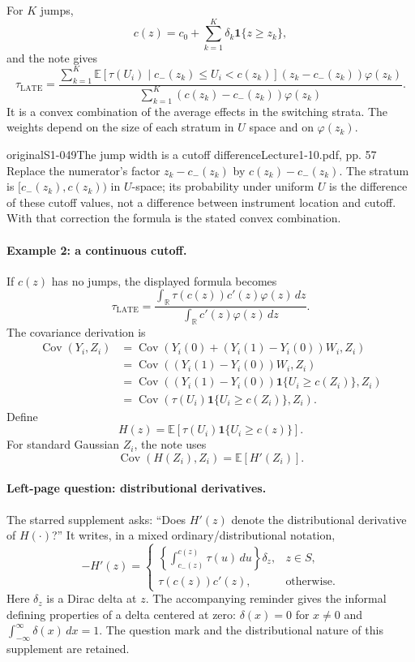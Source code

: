 For $K$ jumps,
\[
 c(z)=c_0+\sum_{k=1}^K\delta_k\mathbf1\{z\ge z_k\},
\]
and the note gives
\[
 \tau_{\mathrm{LATE}}=
 \frac{\displaystyle\sum_{k=1}^K
 \mathbb E[\tau(U_i)\mid c_-(z_k)\le U_i<c(z_k)]
 (z_k-c_-(z_k))\varphi(z_k)}
 {\displaystyle\sum_{k=1}^K(c(z_k)-c_-(z_k))\varphi(z_k)}.
\]
It is a convex combination of the average effects in the switching strata. The weights depend on the size of each stratum in $U$ space and on $\varphi(z_k)$.
\begin{reviewnote}{original}{S1-049}{The jump width is a cutoff difference}{Lecture1-10.pdf, pp. 57}
Replace the numerator's factor $z_k-c_-(z_k)$ by $c(z_k)-c_-(z_k)$. The stratum is $[c_-(z_k),c(z_k))$ in $U$-space; its probability under uniform $U$ is the difference of these cutoff values, not a difference between instrument location and cutoff. With that correction the formula is the stated convex combination.
\end{reviewnote}



\paragraph{Example 2: a continuous cutoff.}
If $c(z)$ has no jumps, the displayed formula becomes
\[
 \tau_{\mathrm{LATE}}=
 \frac{\displaystyle\int_{\mathbb R}\tau(c(z))c'(z)\varphi(z)\,dz}
 {\displaystyle\int_{\mathbb R}c'(z)\varphi(z)\,dz}.
\]
The covariance derivation is
\begin{align*}
 \operatorname{Cov}(Y_i,Z_i)
 &=\operatorname{Cov}(Y_i(0)+(Y_i(1)-Y_i(0))W_i,Z_i)\\
 &=\operatorname{Cov}((Y_i(1)-Y_i(0))W_i,Z_i)\\
 &=\operatorname{Cov}((Y_i(1)-Y_i(0))\mathbf1\{U_i\ge c(Z_i)\},Z_i)\\
 &=\operatorname{Cov}(\tau(U_i)\mathbf1\{U_i\ge c(Z_i)\},Z_i).
\end{align*}
Define
\[
 H(z)=\mathbb E[\tau(U_i)\mathbf1\{U_i\ge c(z)\}].
\]
For standard Gaussian $Z_i$, the note uses
\[
 \operatorname{Cov}(H(Z_i),Z_i)=\mathbb E[H'(Z_i)].
\]

\paragraph{Left-page question: distributional derivatives.}
The starred supplement asks: ``Does $H'(z)$ denote the distributional derivative of $H(\cdot)$?'' It writes, in a mixed ordinary/distributional notation,
\[
 -H'(z)=
 \begin{cases}
 \displaystyle\left\{\int_{c_-(z)}^{c(z)}\tau(u)\,du\right\}\delta_z,
 &z\in S,\\
 \tau(c(z))c'(z),&\text{otherwise}.
 \end{cases}
\]
Here $\delta_z$ is a Dirac delta at $z$. The accompanying reminder gives the informal defining properties of a delta centered at zero: $\delta(x)=0$ for $x\ne0$ and $\int_{-\infty}^{\infty}\delta(x)\,dx=1$. The question mark and the distributional nature of this supplement are retained.


